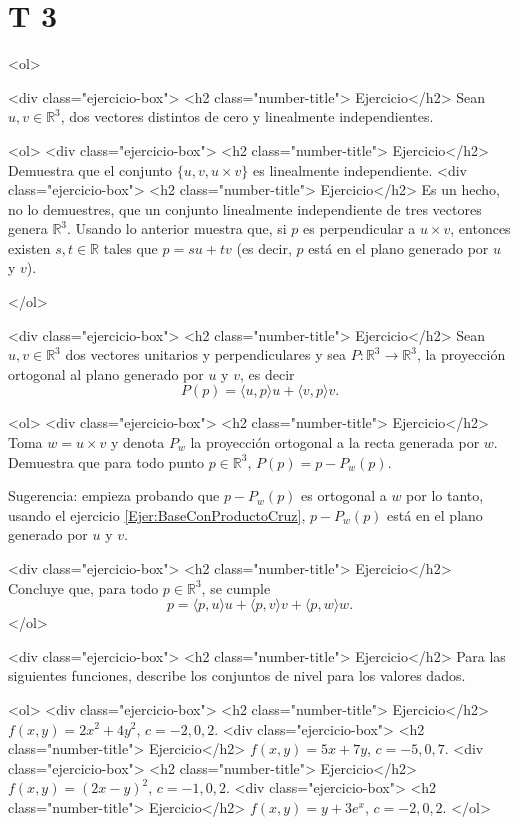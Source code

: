 \documentclass{article}
\theoremstyle{definition}
\begin{document}
  \section*{T 3}


<ol>

<div class="ejercicio-box"> <h2 class="number-title"> Ejercicio</h2>\label{Ejer:BaseConProductoCruz} Sean $u,v\in \mathbb{R}^3$, dos vectores distintos de cero y linealmente
  independientes.

<ol>
<div class="ejercicio-box"> <h2 class="number-title"> Ejercicio</h2> Demuestra que el conjunto
  $\{u,v, u\times v\}$ es linealmente independiente.
  <div class="ejercicio-box"> <h2 class="number-title"> Ejercicio</h2> Es un hecho, no lo demuestres, que un conjunto linealmente independiente de tres vectores genera
  $\mathbb{R}^3$. Usando lo anterior muestra que, si $p$ es perpendicular a $u\times v$, entonces existen
  $s,t\in \mathbb{R}$ tales que $p=su+tv$ (es decir, $p$ está en el plano generado por $u$ y $v$).
  
  </ol>

<div class="ejercicio-box"> <h2 class="number-title"> Ejercicio</h2> Sean $u,v\in \mathbb{R}^3$ dos vectores unitarios y perpendiculares y sea $P:\mathbb{R}^3 \to \mathbb{R}^3$,
la proyección ortogonal al plano generado por $u$ y $v$, es decir
$$
P(p)= \langle u,p\rangle u + \langle v, p \rangle v.
$$

<ol>
<div class="ejercicio-box"> <h2 class="number-title"> Ejercicio</h2> Toma $w=u\times v$ y denota $P_w$ la proyección ortogonal a la recta generada por $w$. Demuestra que para todo punto $p\in \mathbb{R}^3$, $P(p)=p-P_{w}(p)$. 
	
	Sugerencia: empieza probando que $p-P_w(p)$ es ortogonal a $w$ por lo tanto, usando el ejercicio \ref{Ejer:BaseConProductoCruz}, $p-P_w(p)$ está en el plano generado por $u$ y $v$.


<div class="ejercicio-box"> <h2 class="number-title"> Ejercicio</h2> Concluye que,  para todo
$p\in \mathbb{R}^3$, se cumple
$$
p=\langle p, u \rangle u + \langle p, v \rangle v + \langle p, w \rangle w.
$$
</ol>

<div class="ejercicio-box"> <h2 class="number-title"> Ejercicio</h2> Para las siguientes 	funciones, describe los conjuntos de nivel para los valores dados.
	
	<ol>
	<div class="ejercicio-box"> <h2 class="number-title"> Ejercicio</h2> $f(x,y)=2x^2+4y^2$, $c=-2,0,2$.
	<div class="ejercicio-box"> <h2 class="number-title"> Ejercicio</h2> $f(x,y)=5x+7y$, $c=-5,0,7$.
	<div class="ejercicio-box"> <h2 class="number-title"> Ejercicio</h2> $f(x,y)=(2x-y)^2$, $c=-1,0,2$.
	<div class="ejercicio-box"> <h2 class="number-title"> Ejercicio</h2> $f(x,y)=y+3e^x$, $c=-2,0,2$.
</ol>		
	
\end{document}
